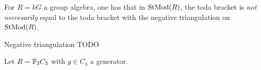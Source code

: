 For \( R = kG \) a group algebra, one has that in \( \operatorname{StMod}(R) \), the toda bracket is \emph{not neccesarily} equal to the toda bracket with the negative triangulation on \( \operatorname{StMod}(R) \).

\begin{definition}
    Negative triangulation TODO
\end{definition}

Let \( R = {\mathbb{F}}_3C_3 \) with \( g \in C_3 \) a generator.
